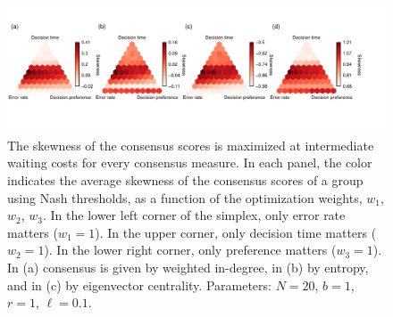 \documentclass{article}
\begin{document}
\begin{figure}[ht]
\includegraphics[width=6.83in]{multi_skewness.pdf}
\caption{\label{supp_skewness} The skewness of the consensus scores is maximized at intermediate waiting costs for every consensus measure. In each panel, the color indicates the average skewness of the consensus scores of a group using Nash thresholds, as a function of the optimization weights, $w_1$, $w_2$, $w_3$. In the lower left corner of the simplex, only error rate matters ($w_1=1$).  In the upper corner, only decision time matters ($w_2=1$).  In the lower right corner, only preference matters ($w_3=1$). In (a) consensus is given by weighted in-degree, in (b) by entropy, and in (c) by eigenvector centrality. Parameters: $N=20$, $b=1$, $r=1$, $\ell=0.1$.} 
\end{figure}

\end{document}
